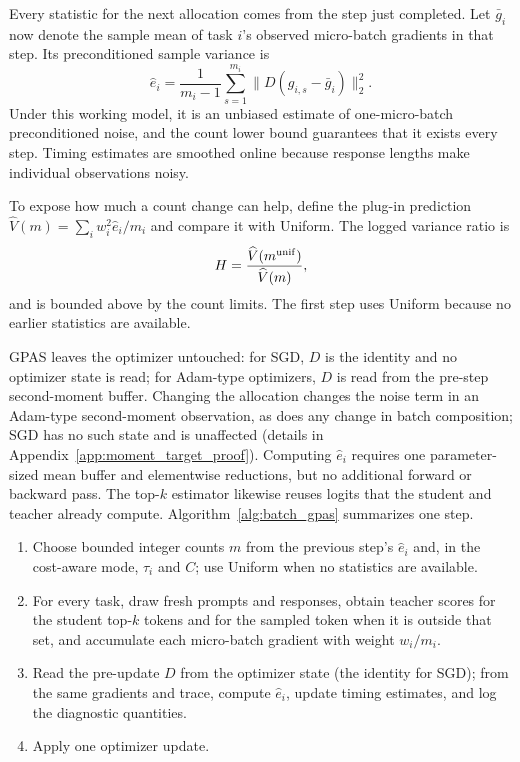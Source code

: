 Every statistic for the next allocation comes from the step just completed.
Let $\bar g_i$ now denote the sample mean of task $i$'s observed micro-batch
gradients in that step. Its preconditioned sample variance is
\begin{equation}
    \widehat e_i=\frac{1}{m_i-1}\sum_{s=1}^{m_i}
    \bigl\|D(g_{i,s}-\bar g_i)\bigr\|_2^2.
    \label{eq:noise_estimate}
\end{equation}
Under this working model, it is an unbiased estimate of one-micro-batch
preconditioned noise, and the count lower bound guarantees that it exists every
step. Timing estimates are smoothed online because response lengths make
individual observations noisy.

To expose how much a count change can help, define the plug-in prediction
$\widehat V(m)=\sum_iw_i^2\widehat e_i/m_i$ and compare it with Uniform. The
logged variance ratio is
\begin{equation}
    H=\frac{\widehat V(m^{\rm unif})}{\widehat V(m)},
    \label{eq:allocation_variance_ratio}
\end{equation}
and is bounded above by the count limits. The first step uses Uniform because
no earlier statistics are available.

GPAS leaves the optimizer untouched: for SGD, $D$ is the identity and no
optimizer state is read; for Adam-type optimizers, $D$ is read from the
pre-step second-moment buffer. Changing the allocation changes the noise term
in an Adam-type second-moment observation, as does any change in batch
composition; SGD has no such state and is unaffected (details in
Appendix~\ref{app:moment_target_proof}). Computing $\widehat e_i$ requires one
parameter-sized mean buffer and elementwise reductions, but no additional
forward or backward pass. The top-$k$ estimator likewise reuses logits that
the student and teacher already compute. Algorithm~\ref{alg:batch_gpas}
summarizes one step.

\begin{algorithm}[H]
\caption{One optimizer step with GPAS.}
\label{alg:batch_gpas}
\small
\begin{minipage}{0.97\linewidth}
\begin{enumerate}
    \item Choose bounded integer counts $m$ from the previous step's
    $\widehat e_i$ and, in the cost-aware mode, $\tau_i$ and $C$; use Uniform
    when no statistics are available.
    \item For every task, draw fresh prompts and responses, obtain teacher
    scores for the student top-$k$ tokens and for the sampled token when it is
    outside that set, and accumulate each micro-batch gradient with weight
    $w_i/m_i$.
    \item Read the pre-update $D$ from the optimizer state (the identity for
    SGD); from the same gradients and trace, compute $\widehat e_i$, update
    timing estimates, and log the diagnostic quantities.
    \item Apply one optimizer update.
\end{enumerate}
\end{minipage}
\end{algorithm}
